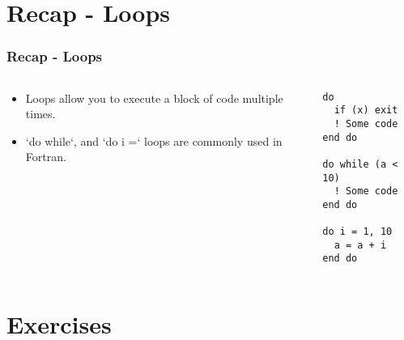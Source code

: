 \documentclass[10pt]{beamer}
\begin{document}
\section{Recap - Loops}

\begin{frame}[fragile]
  \frametitle{Recap - Loops}
  \begin{columns}[T]
    \begin{column}{0.5\textwidth}
    \begin{itemize}
        \item Loops allow you to execute a block of code multiple times.
        \item `do while`, and `do i =` loops are commonly used in Fortran.
      \end{itemize}
    \end{column}

    \begin{column}{0.5\textwidth}
      \begin{lstlisting}
do
  if (x) exit
  ! Some code
end do

do while (a < 10)
  ! Some code
end do

do i = 1, 10
  a = a + i
end do
      \end{lstlisting}
    \end{column}
  \end{columns}
\end{frame}

\section{Exercises}
\end{document}

